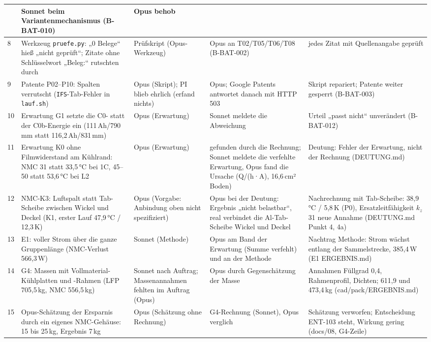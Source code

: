 \documentclass[10pt,a4paper]{article}
\begin{document}
\begin{longtable}{@{}p{0.4cm}p{3.6cm}p{2.5cm}p{4.4cm}p{3.0cm}@{}}
 & Sonnet beim Variantenmechanismus (B-BAT-010) & Opus behob\\\midrule
8 & Werkzeug \texttt{pruefe.py}: „0 Belege“ hieß „nicht geprüft“; Zitate ohne Schlüsselwort „Beleg:“ rutschten durch & Prüfskript (Opus-Werkzeug)
 & Opus an T02/T05/T06/T08 (B-BAT-002) & jedes Zitat mit Quellenangabe geprüft\\
9 & Patente P02–P10: Spalten verrutscht (\texttt{IFS}-Tab-Fehler in \texttt{lauf.sh}) & Opus (Skript); PI blieb ehrlich (erfand nichts)
 & Opus; Google Patents antwortet danach mit HTTP 503 & Skript repariert; Patente weiter gesperrt (B-BAT-003)\\
10 & Erwartung G1 setzte die C0- statt der C0b-Energie ein (111\,Ah/790\,mm statt 116,2\,Ah/831\,mm) & Opus (Erwartung)
 & Sonnet meldete die Abweichung & Urteil „passt nicht“ unverändert (B-BAT-012)\\
11 & Erwartung K0 ohne Filmwiderstand am Kühlrand: NMC 31 statt 33,5\,°C bei 1C, 45--50 statt 53,6\,°C bei L2 & Opus (Erwartung)
 & gefunden durch die Rechnung; Sonnet meldete die verfehlte Erwartung, Opus fand die Ursache (Q/(h·A), 16,6\,cm² Boden) & Deutung: Fehler der Erwartung, nicht der Rechnung (DEUTUNG.md)\\\midrule
12 & NMC-K3: Luftspalt statt Tab-Scheibe zwischen Wickel und Deckel (K1, erster Lauf 47,9\,°C / 12,3\,K) & Opus (Vorgabe: Anbindung oben nicht spezifiziert)
 & Opus bei der Deutung: Ergebnis „nicht belastbar“, real verbindet die Al-Tab-Scheibe Wickel und Deckel & Nachrechnung mit Tab-Scheibe: 38,9\,°C / 5,8\,K (P0), Ersatzleitfähigkeit $k_z$ 31 neue Annahme (DEUTUNG.md Punkt 4, 4a)\\
13 & E1: voller Strom über die ganze Gruppenlänge (NMC-Verlust 566,3\,W) & Sonnet (Methode)
 & Opus am Band der Erwartung (Summe verfehlt) und an der Methode & Nachtrag Methode: Strom wächst entlang der Sammelstrecke, 385,4\,W (E1 ERGEBNIS.md)\\
14 & G4: Massen mit Vollmaterial-Kühlplatten und -Rahmen (LFP 705,5\,kg, NMC 556,5\,kg) & Sonnet nach Auftrag; Massenannahmen fehlten im Auftrag (Opus)
 & Opus durch Gegenschätzung der Masse & Annahmen Füllgrad 0,4, Rahmenprofil, Dichten; 611,9 und 473,4\,kg (cad/pack/ERGEBNIS.md)\\
15 & Opus-Schätzung der Ersparnis durch ein eigenes NMC-Gehäuse: 15 bis 25\,kg, Ergebnis 7\,kg & Opus (Schätzung ohne Rechnung)
 & G4-Rechnung (Sonnet), Opus verglich & Schätzung verworfen; Entscheidung ENT-103 steht, Wirkung gering (docs/08, G4-Zeile)\\

\end{longtable}
\end{document}
